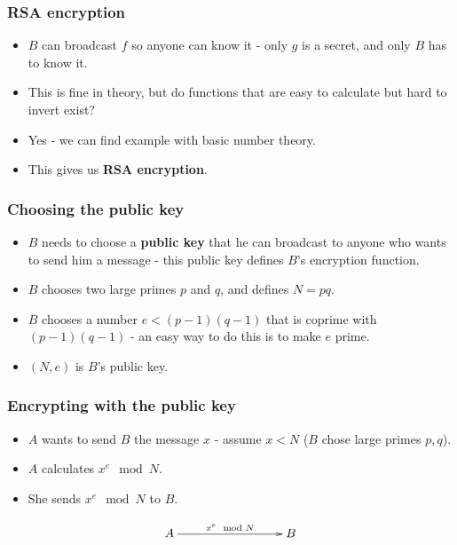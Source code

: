 \documentclass[handout]{beamer}
\begin{document}
\begin{frame}
\frametitle{RSA encryption}
\begin{itemize}
\item $B$ can broadcast $f$ so anyone can know it - only $g$ is a secret, and only $B$ has to know it.
\vspace{1cm}
\item This is fine in theory, but do functions that are easy to calculate but hard to invert exist?
\vspace{1cm}
\item Yes - we can find example with basic number theory.
\vspace{1cm}
\item This gives us \textbf{RSA encryption}.
\end{itemize}
\end{frame}


\begin{frame}
\frametitle{Choosing the public key}
\begin{itemize}
\item $B$ needs to choose a \textbf{public key} that he can broadcast to anyone who wants to send him a message - this public key defines $B$'s encryption function.
\vspace{1cm}
\item $B$ chooses two large primes $p$ and $q$, and defines $N= pq$.
\vspace{1cm}
\item $B$ chooses a number $e<(p-1)(q-1)$ that is coprime with $(p-1)(q-1)$ - an easy way to do this is to make $e$ prime.
\vspace{1cm}
\item $(N,e)$ is $B$'s public key.
\end{itemize}

\end{frame}

\begin{frame}
\frametitle{Encrypting with the public key}
\begin{itemize}
\item $A$ wants to send $B$ the message $x$ - assume $x<N$ ($B$ chose large primes $p,q$).
\vspace{1cm}
\item $A$ calculates $x^e \mod N$. 
\vspace{1cm}
\item She sends $x^e\mod N$ to $B$.
\end{itemize}
\[\xymatrix{A\ar[rrr]^{x^e\mod N} & & & B}\]
\end{frame}
\end{document}
